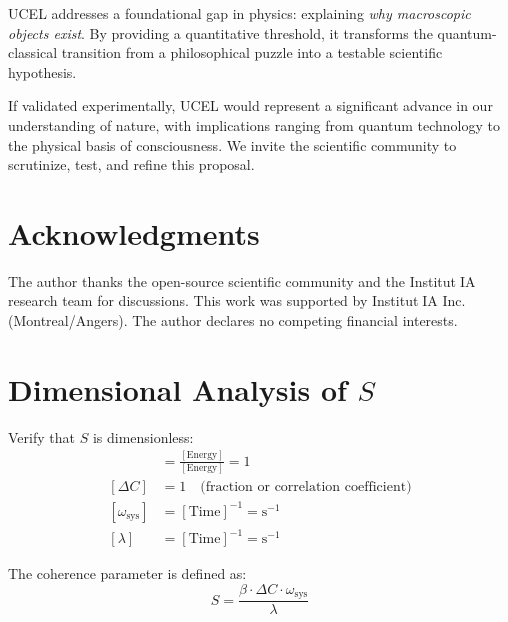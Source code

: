 \documentclass[12pt,a4paper]{article}
\begin{document}
UCEL addresses a foundational gap in physics: explaining \emph{why macroscopic objects exist}. By providing a quantitative threshold, it transforms the quantum-classical transition from a philosophical puzzle into a testable scientific hypothesis.

If validated experimentally, UCEL would represent a significant advance in our understanding of nature, with implications ranging from quantum technology to the physical basis of consciousness. We invite the scientific community to scrutinize, test, and refine this proposal.

\section*{Acknowledgments}

The author thanks the open-source scientific community and the Institut🦋IA research team for discussions. This work was supported by Institut🦋IA Inc. (Montreal/Angers). The author declares no competing financial interests.




\appendix

\section{Dimensional Analysis of $S$}
\label{app:dimensions}

Verify that $S$ is dimensionless:
\begin{align}
[\beta] &= \frac{[\text{Energy}]}{[\text{Energy}]} = 1 \\
[\Delta C] &= 1 \quad \text{(fraction or correlation coefficient)} \\
[\omega_{\text{sys}}] &= [\text{Time}]^{-1} = \text{s}^{-1} \\
[\lambda] &= [\text{Time}]^{-1} = \text{s}^{-1}
\end{align}

The coherence parameter is defined as:
\begin{equation}
S = \frac{\beta \cdot \Delta C \cdot \omega_{\text{sys}}}{\lambda}
\end{equation}
\end{document}
